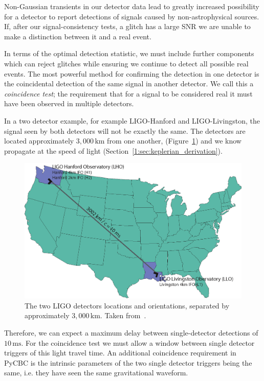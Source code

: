 Non-Gaussian transients in our detector data lead to greatly increased possibility for a \gwadj detector to report detections of \gwadj signals caused by non-astrophysical sources. If, after our signal-consistency tests, a glitch has a large SNR we are unable to make a distinction between it and a real event.

In terms of the optimal detection statistic, we must include further components which can reject glitches while ensuring we continue to detect all possible real events. The most powerful method for confirming the detection in one detector is the coincidental detection of the same signal in another detector. We call this a \textit{coincidence test}; the requirement that for a signal to be considered real it must have been observed in multiple detectors.

In a two detector example, for example LIGO-Hanford and LIGO-Livingston, the signal seen by both detectors will not be exactly the same. The detectors are located approximately $3,000 \, \text{km}$ from one another, (Figure~\ref{2:fig:observatories}) and we know \gws propagate at the speed of light (Section~\ref{1:sec:keplerian_derivation}).
%
\begin{figure}
    \centering
    \includegraphics[width=0.8\linewidth]{images/2_searches/observatories.png}
    \caption{The two LIGO detectors locations and orientations, separated by approximately $3,000 \, \text{km}$. Taken from~\cite{Brown_Thesis:2004}.}
    \label{2:fig:observatories}
\end{figure}
%
Therefore, we can expect a maximum delay between single-detector detections of $10 \, \text{ms}$. For the coincidence test we must allow a window between single detector triggers of this light travel time. An additional coincidence requirement in PyCBC is the intrinsic parameters of the two single detector triggers being the same, i.e. they have seen the same gravitational waveform.


